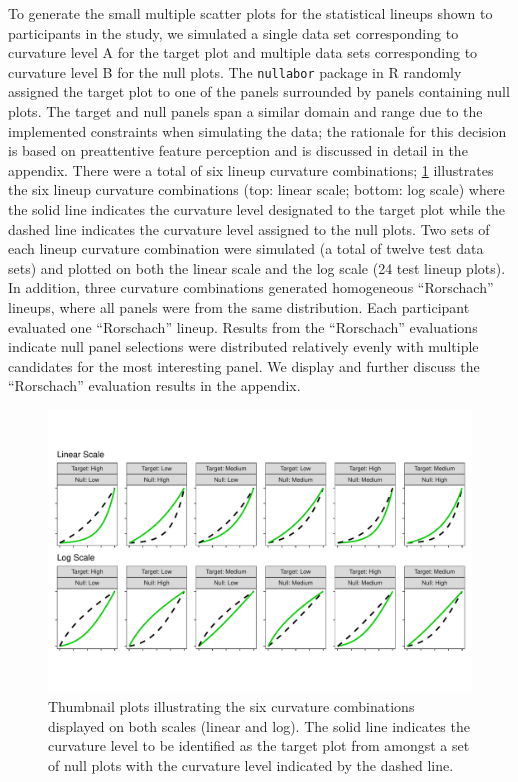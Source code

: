 \documentclass[12pt]{article}
\begin{document}
To generate the small multiple scatter plots for the statistical lineups
shown to participants in the study, we simulated a single data set
corresponding to curvature level A for the target plot and multiple data
sets corresponding to curvature level B for the null plots. The
\texttt{nullabor} package in R \citep{buja_statistical_2009} randomly
assigned the target plot to one of the panels surrounded by panels
containing null plots. The target and null panels span a similar domain
and range due to the implemented constraints when simulating the data;
the rationale for this decision is based on preattentive feature
perception \citep{wolfeWhatPreattentiveFeature2019} and is discussed in
detail in the appendix. There were a total of six lineup curvature
combinations; \cref{fig:curvature-combination-example} illustrates the
six lineup curvature combinations (top: linear scale; bottom: log scale)
where the solid line indicates the curvature level designated to the
target plot while the dashed line indicates the curvature level assigned
to the null plots. Two sets of each lineup curvature combination were
simulated (a total of twelve test data sets) and plotted on both the
linear scale and the log scale (24 test lineup plots). In addition,
three curvature combinations generated homogeneous ``Rorschach''
lineups, where all panels were from the same distribution. Each
participant evaluated one ``Rorschach'' lineup. Results from the
``Rorschach'' evaluations indicate null panel selections were
distributed relatively evenly with multiple candidates for the most
interesting panel. We display and further discuss the ``Rorschach''
evaluation results in the appendix.

\begin{figure}[tbp]

{\centering \includegraphics[width=1\linewidth,]{logarithmic-lineups-revisions_files/figure-latex/curvature-combination-example-1} 

}

\caption[Lineup curvature combinations]{Thumbnail plots illustrating the six curvature combinations displayed on both scales (linear and log). The solid line indicates the curvature level to be identified as the target plot from amongst a set of null plots with the curvature level indicated by the dashed line.}\label{fig:curvature-combination-example}
\end{figure}
\end{document}
